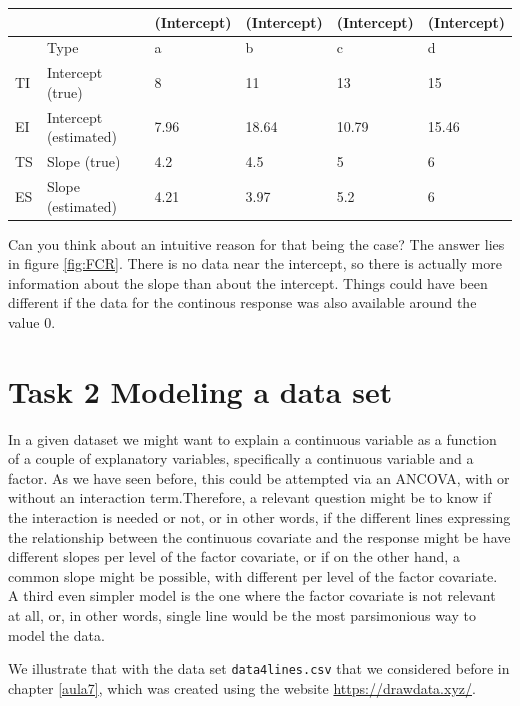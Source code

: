 \documentclass[
]{book}
\begin{document}
\begin{tabular}{l|l|l|l|l|l}
\hline
  &  & (Intercept) & (Intercept) & (Intercept) & (Intercept)\\
\hline
 & Type & a & b & c & d\\
\hline
TI & Intercept (true) & 8 & 11 & 13 & 15\\
\hline
EI & Intercept (estimated) & 7.96 & 18.64 & 10.79 & 15.46\\
\hline
TS & Slope (true) & 4.2 & 4.5 & 5 & 6\\
\hline
ES & Slope (estimated) & 4.21 & 3.97 & 5.2 & 6\\
\hline
\end{tabular}

Can you think about an intuitive reason for that being the case? The answer lies in figure \ref{fig:FCR}. There is no data near the intercept, so there is actually more information about the slope than about the intercept. Things could have been different if the data for the continous response was also available around the value 0.

\section{Task 2 Modeling a data set}\label{task-2-modeling-a-data-set}

In a given dataset we might want to explain a continuous variable as a function of a couple of explanatory variables, specifically a continuous variable and a factor. As we have seen before, this could be attempted via an ANCOVA, with or without an interaction term.Therefore, a relevant question might be to know if the interaction is needed or not, or in other words, if the different lines expressing the relationship between the continuous covariate and the response might be have different slopes per level of the factor covariate, or if on the other hand, a common slope might be possible, with different per level of the factor covariate. A third even simpler model is the one where the factor covariate is not relevant at all, or, in other words, single line would be the most parsimonious way to model the data.

We illustrate that with the data set \texttt{data4lines.csv} that we considered before in chapter \ref{aula7}, which was created using the website \url{https://drawdata.xyz/}.
\end{document}
